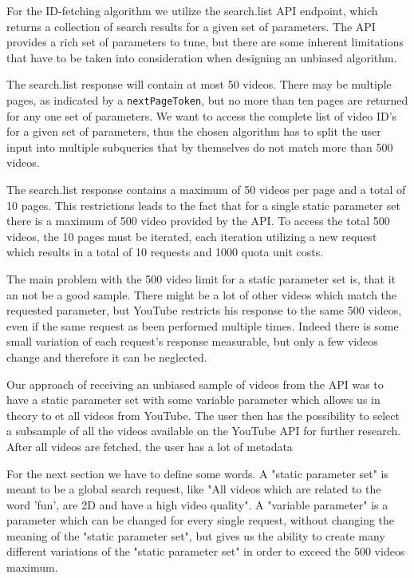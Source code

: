 For the ID-fetching algorithm we utilize the search.list API endpoint, which
returns a collection of search results for a given set of parameters. The API %
provides a rich set of parameters to tune, but there are some inherent
limitations that have to be taken into consideration when designing an unbiased
algorithm.

The search.list response will contain at most 50 videos. There may be
multiple pages, as indicated by a \texttt{nextPageToken}, but no more than ten
pages are returned for any one set of parameters. We want to access the %
complete list of video ID's for a given set of parameters, thus the chosen
algorithm has to split the user input into multiple subqueries that by
themselves do not match more than 500 videos.

The search.list response contains a maximum of 50 videos per page and a total of
10 pages. This restrictions leads to the fact that for a single static parameter
set there is a maximum of 500 video provided by the API. To access the total 500
videos, the 10 pages must be iterated, each iteration utilizing a new request
which results in a total of 10 requests and 1000 quota unit costs.

The main problem with the 500 video limit for a static parameter set is, that it
an not be a good sample. There might be a lot of other videos which match the
requested parameter, but YouTube restricts his response to the same 500 videos,
even if the same request as been performed multiple times. Indeed there is some
small variation of each request's response measurable, but only a few videos
change and therefore it can be neglected.

Our approach of receiving an unbiased sample of videos from the API was to have
a static parameter set with some variable parameter which allows us in theory to
et all videos from YouTube. The user then has the possibility to select a
subsample of all the videos available on the YouTube API for further research. 
After all videos are fetched, the user has a lot of metadata

For the next section we have to define some words.
A "static parameter set" is meant to be a global search request, like "All
videos which are related to the word 'fun', are 2D and have a high video
quality". A "variable parameter" is a parameter which can be changed for every
single request, without changing the meaning of the "static parameter set", but
gives us the ability to create many different variations of the "static
parameter set" in order to exceed the 500 videos maximum.
 
